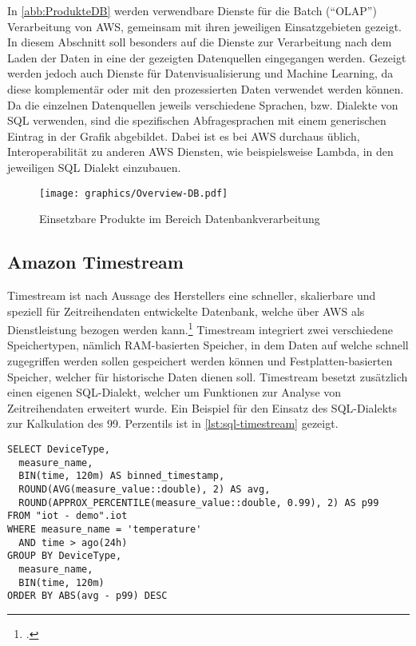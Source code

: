 In \autoref{abb:ProdukteDB} werden verwendbare Dienste für die Batch (\enquote{\ac{OLAP}}) Verarbeitung von \ac{AWS}, gemeinsam mit ihren jeweiligen Einsatzgebieten gezeigt. In diesem Abschnitt soll besonders auf die Dienste zur Verarbeitung nach dem Laden der Daten in eine der gezeigten Datenquellen eingegangen werden. Gezeigt werden jedoch auch Dienste für Datenvisualisierung und Machine Learning, da diese komplementär oder mit den prozessierten Daten verwendet werden können. Da die einzelnen Datenquellen jeweils verschiedene Sprachen, bzw. Dialekte von \ac{SQL} verwenden, sind die spezifischen Abfragesprachen mit einem generischen Eintrag in der Grafik abgebildet. Dabei ist es bei \ac{AWS} durchaus üblich, Interoperabilität zu anderen \ac{AWS} Diensten, wie beispielsweise Lambda, in den jeweiligen \ac{SQL} Dialekt einzubauen.

\begin{figure}[H]
\centering
\texttt{[image: graphics/Overview-DB.pdf]}
\caption{Einsetzbare Produkte im Bereich Datenbankverarbeitung}
\label{abb:ProdukteDB}
\end{figure}


\subsection{Amazon Timestream}
Timestream ist nach Aussage des Herstellers eine schneller, skalierbare und speziell für Zeitreihendaten entwickelte Datenbank, welche über \ac{AWS} als Dienstleistung bezogen werden kann.\footcite[Vgl. auch im Folgenden][]{AmazonWebServicesInc..o.J.h} Timestream integriert zwei verschiedene Speichertypen, nämlich \ac{RAM}-basierten Speicher, in dem Daten auf welche schnell zugegriffen werden sollen gespeichert werden können und Festplatten-basierten Speicher, welcher für historische Daten dienen soll.
Timestream besetzt zusätzlich einen eigenen \ac{SQL}-Dialekt, welcher um Funktionen zur Analyse von Zeitreihendaten erweitert wurde. Ein Beispiel für den Einsatz des \ac{SQL}-Dialekts zur Kalkulation des 99. Perzentils ist in \autoref{lst:sql-timestream} gezeigt.
\lstset{language=SQL} 

\begin{lstlisting}[caption={Berechnung des 99. Perzentils in Timestream},label=lst:sql-timestream, captionpos=b]
SELECT DeviceType,
  measure_name,
  BIN(time, 120m) AS binned_timestamp,
  ROUND(AVG(measure_value::double), 2) AS avg,
  ROUND(APPROX_PERCENTILE(measure_value::double, 0.99), 2) AS p99 
FROM "iot - demo".iot 
WHERE measure_name = 'temperature' 
  AND time > ago(24h) 
GROUP BY DeviceType,
  measure_name,
  BIN(time, 120m) 
ORDER BY ABS(avg - p99) DESC
\end{lstlisting}

